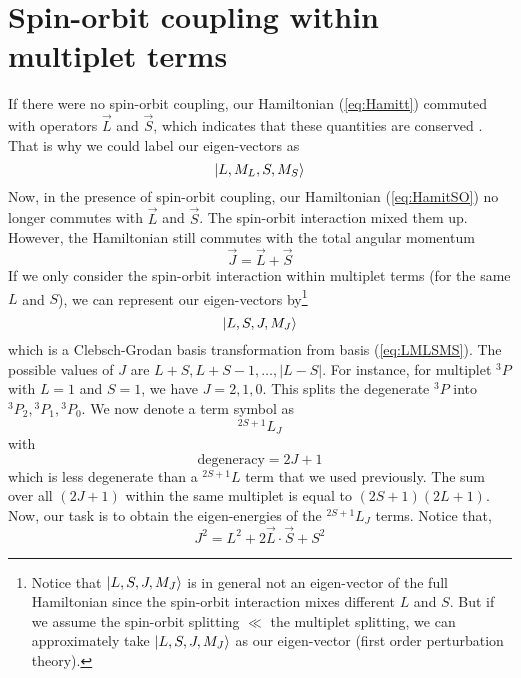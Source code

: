 \section{Spin-orbit coupling within multiplet terms}
If there were no spin-orbit coupling, our Hamiltonian (\ref{eq:Hamitt}) commuted
with operators $\vec{L}$ and $\vec{S}$, which indicates that these
quantities are conserved \cite{QM}. That is why we could label our eigen-vectors as
\begin{equation} \label{eq:LMLSMS}
\Ket{L,M_L,S,M_S}
\end{equation}
%
Now, in the presence of spin-orbit coupling, our Hamiltonian (\ref{eq:HamitSO}) no
longer commutes with $\vec{L}$ and $\vec{S}$. The spin-orbit interaction mixed them
up. However, the Hamiltonian still commutes with the total angular momentum
\begin{equation} \label{eq:JLS}
\vec{J} = \vec{L} + \vec{S}
\end{equation}
%
If we only consider the spin-orbit interaction
within multiplet terms (for the same $L$ and $S$),
we can represent our eigen-vectors by\footnote{Notice that $\Ket{L,S,J,M_J}$ is
in general not an eigen-vector of the full Hamiltonian since the spin-orbit
interaction mixes different $L$ and $S$. But if we assume the spin-orbit splitting
$\ll$ the multiplet splitting, we can approximately take $\Ket{L,S,J,M_J}$ as our
eigen-vector (first order perturbation theory).}
\begin{equation} \label{eq:LSJMJ}
\Ket{L,S,J,M_J}
\end{equation}
which is a Clebsch-Grodan basis transformation \cite{WB} from basis (\ref{eq:LMLSMS}).
The possible values of $J$ are $L+S,L+S-1,\ldots,|L-S|$. For instance, for multiplet
$^3P$ with $L=1$ and $S=1$, we have $J=2,1,0$. This splits the degenerate $^3P$ into
$^3P_2,{^3P_1},{^3P_0}$. We now denote a term symbol as
\begin{equation} \label{eq:SLJ}
^{2S+1}L_J
\end{equation}
with
\begin{equation} \label{eq:SLJDegen}
\mathrm{degeneracy} = 2J+1
\end{equation}
which is less degenerate than a $^{2S+1}L$ term that we used previously.
The sum over all $(2J+1)$ within the same multiplet is equal to $(2S+1)(2L+1)$.
Now, our task is to obtain the eigen-energies of the $^{2S+1}L_J$ terms. Notice that,
\begin{equation} \label{eq:Jsq}
J^2 = L^2 + 2\vec{L}\cdot\vec{S} + S^2
\end{equation}
